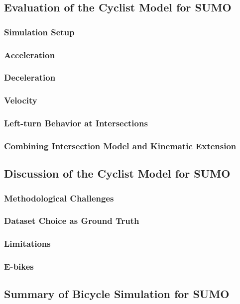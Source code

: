 \subsection{Evaluation of the Cyclist Model for SUMO}
\label{sec:evaluation_sumo}


\subsubsection{Simulation Setup}
\label{sec:simulation_setup}

\subsubsection{Acceleration}
\label{sec:acceleration}

\subsubsection{Deceleration}
\label{sec:deceleration}

\subsubsection{Velocity}
\label{sec:velocity}

\subsubsection{Left-turn Behavior at Intersections}
\label{sec:left-turn_behavior_at_intersections}

\subsubsection{Combining Intersection Model and Kinematic Extension}
\label{sec:combinin_intersection_model_and_kinematic_extension}


\subsection{Discussion of the Cyclist Model for SUMO}
\label{sec:discussion_sumo}


\subsubsection{Methodological Challenges}
\label{sec:methodological_challenges}

\subsubsection{Dataset Choice as Ground Truth}
\label{sec:dataset_choice_as_ground_truth}

\subsubsection{Limitations}
\label{sec:limitations_sumo}

\subsubsection{E-bikes}
\label{sec:e-bikes}

\subsection{Summary of Bicycle Simulation for SUMO}
\label{summary_sumo}